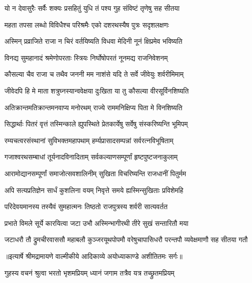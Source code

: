 \twolineshloka
{यो न देवासुरैः सर्वैः शक्यः प्रसहितुं युधि}
{तं पश्य गुह संविष्टं तृणेषु सह सीतया} %

\twolineshloka
{महता तपसा लब्धो विविधैश्च परिश्रमैः}
{एको दशरथस्यैष पुत्रः सदृशलक्षणः} %

\twolineshloka
{अस्मिन् प्रव्राजिते राजा न चिरं वर्तयिष्यति}
{विधवा मेदिनी नूनं क्षिप्रमेव भविष्यति} %

\twolineshloka
{विनद्य सुमहानादं श्रमेणोपरताः स्त्रियः}
{निर्घोषोपरतं नूनमद्य राजनिवेशनम्} %

\twolineshloka
{कौसल्या चैव राजा च तथैव जननी मम}
{नाशंसे यदि ते सर्वे जीवेयुः शर्वरीमिमाम्} %

\twolineshloka
{जीवेदपि हि मे माता शत्रुघ्नस्यान्ववेक्षया}
{दुःखिता या तु कौसल्या वीरसूर्विनशिष्यति} %

\twolineshloka
{अतिक्रान्तमतिक्रान्तमनवाप्य मनोरथम्}
{राज्ये राममनिक्षिप्य पिता मे विनशिष्यति} %

\twolineshloka
{सिद्धार्थाः पितरं वृत्तं तस्मिन्काले ह्युपस्थिते}
{प्रेतकार्येषु सर्वेषु संस्करिष्यन्ति भूमिपम्} %

\twolineshloka
{रम्यचत्वरसंस्थानां सुविभक्तमहापथाम्}
{हर्म्यप्रासादसम्पन्नां सर्वरत्नविभूषिताम्} %

\twolineshloka
{गजाश्वरथसम्बाधां तूर्यनादविनादिताम्}
{सर्वकल्याणसम्पूर्णां हृष्टपुष्टजनाकुलाम्} %

\twolineshloka
{आरामोद्यानसम्पूर्णां समाजोत्सवशालिनीम्}
{सुखिता विचरिष्यन्ति राजधानीं पितुर्मम} %

\twolineshloka
{अपि सत्यप्रतिज्ञेन सार्धं कुशलिना वयम्}
{निवृत्ते समये ह्यस्मिन्सुखिताः प्रविशेमहि} %

\twolineshloka
{परिदेवयमानस्य तस्यैवं सुमहात्मनः}
{तिष्ठतो राजपुत्रस्य शर्वरी सात्यवर्तत} %

\twolineshloka
{प्रभाते विमले सूर्ये कारयित्वा जटा उभौ}
{अस्मिन्भागीरथी तीरे सुखं सन्तारितौ मया} %

\fourlineindentedshloka
{जटाधरौ तौ द्रुमचीरवाससौ}
{महाबलौ कुञ्जरयूथपोपमौ}
{वरेषुचापासिधरौ परन्तपौ}
{व्यवेक्षमाणौ सह सीतया गतौ} %


{॥इत्यार्षे श्रीमद्रामायणे वाल्मीकीये आदिकाव्ये अयोध्याकाण्डे अशीतितमः सर्गः॥}


\twolineshloka
{गुहस्य वचनं श्रुत्वा भरतो भृशमप्रियम्}
{ध्यानं जगाम तत्रैव यत्र तच्छ्रुतमप्रियम्} %

